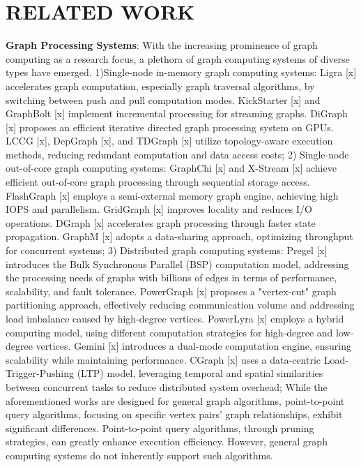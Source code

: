 \documentclass[lettersize,journal]{IEEEtran} %
\begin{document}
\section{RELATED WORK}
{\bf{Graph Processing Systems}}: With the increasing prominence of graph computing as a research focus, a plethora of graph computing systems of diverse types have emerged. 1)Single-node in-memory graph computing systems: Ligra [x] accelerates graph computation, especially graph traversal algorithms, by switching between push and pull computation modes. KickStarter [x] and GraphBolt [x] implement incremental processing for streaming graphs. DiGraph [x] proposes an efficient iterative directed graph processing system on GPUs. LCCG [x], DepGraph [x], and TDGraph [x] utilize topology-aware execution methods, reducing redundant computation and data access costs; 2) Single-node out-of-core graph computing systems: GraphChi [x] and X-Stream [x] achieve efficient out-of-core graph processing through sequential storage access. FlashGraph [x] employs a semi-external memory graph engine, achieving high IOPS and parallelism. GridGraph [x] improves locality and reduces I/O operations. DGraph [x] accelerates graph processing through faster state propagation. GraphM [x] adopts a data-sharing approach, optimizing throughput for concurrent systems; 3) Distributed graph computing systems: Pregel [x] introduces the Bulk Synchronous Parallel (BSP) computation model, addressing the processing needs of graphs with billions of edges in terms of performance, scalability, and fault tolerance. PowerGraph [x] proposes a "vertex-cut" graph partitioning approach, effectively reducing communication volume and addressing load imbalance caused by high-degree vertices. PowerLyra [x] employs a hybrid computing model, using different computation strategies for high-degree and low-degree vertices. Gemini [x] introduces a dual-mode computation engine, ensuring scalability while maintaining performance. CGraph [x] uses a data-centric Load-Trigger-Pushing (LTP) model, leveraging temporal and spatial similarities between concurrent tasks to reduce distributed system overhead; While the aforementioned works are designed for general graph algorithms, point-to-point query algorithms, focusing on specific vertex pairs' graph relationships, exhibit significant differences. Point-to-point query algorithms, through pruning strategies, can greatly enhance execution efficiency. However, general graph computing systems do not inherently support such algorithms.
\end{document}
